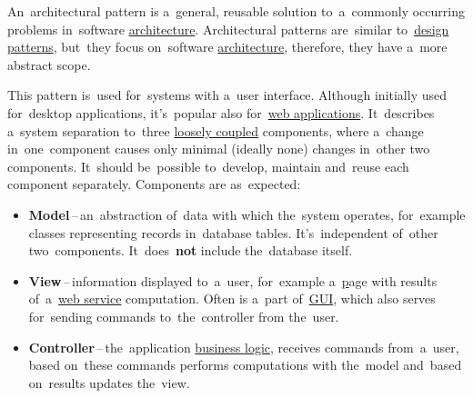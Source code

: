 \label{architecturalpatterns}
An~architectural pattern is a~general, reusable solution to~a~commonly occurring problems in~software \hyperref[architecturedesign]{architecture}.  Architectural patterns are~similar to~\hyperref[designpatterns]{design patterns}, but~they focus on~software \hyperref[architecturedesign]{architecture}, therefore, they have a~more abstract scope.

\label{mvc}
This pattern is~used for~systems with a~user interface. Although initially used for~desktop applications, it's~popular also for~\hyperref[internetweb]{web applications}. It~describes a~system separation to~three \hyperref[loosetightcoupling]{loosely coupled} components, where a~change in~one~component causes only minimal (ideally none) changes in~other two components. It~should be~possible to~develop, maintain and~reuse each component separately. Components are as~expected:
\begin{itemize}
    \item \textbf{Model}\,--\,an~abstraction of~data with which the~system operates, for~example classes representing records in~database tables. It's~independent of~other two~components. \warningnonl It~does~\textbf{not} include the~database itself.
    \item \textbf{View}\,--\,information displayed to~a~user, for~example a~\hyperref[web] page with results of~a~\hyperref[webserviceapplication]{web service} computation. Often is a~part of~\hyperref[shellcligui]{GUI}, which also serves for~sending commands to~the~controller from the~user.
    \item \textbf{Controller}\,--\,the~application \hyperref[businesslogic]{business logic}, receives commands from~a~user, based on~these commands performs computations with the~model and~based on~results updates the~view.
\end{itemize}

